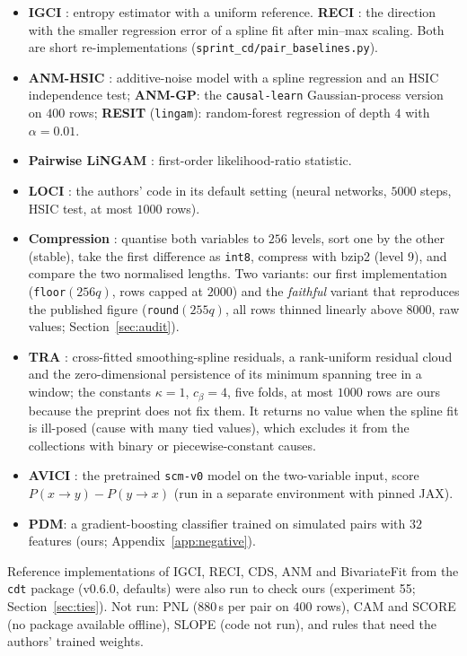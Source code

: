 \begin{itemize}
\item \textbf{IGCI} \citep{daniusis2010inferring}: entropy estimator with a uniform reference. \textbf{RECI} \citep{blobaum2018cause}: the direction with the smaller regression error of a spline fit after min--max scaling. Both are short re-implementations (\texttt{sprint\_cd/pair\_baselines.py}).
\item \textbf{ANM-HSIC} \citep{hoyer2009nonlinear}: additive-noise model with a spline regression and an HSIC independence test; \textbf{ANM-GP}: the \texttt{causal-learn} Gaussian-process version on $400$ rows; \textbf{RESIT} (\texttt{lingam}): random-forest regression of depth $4$ with $\alpha=0.01$.
\item \textbf{Pairwise LiNGAM} \citep{hyvarinen2013pairwise}: first-order likelihood-ratio statistic.
\item \textbf{LOCI} \citep{immer2023loci}: the authors' code in its default setting (neural networks, $5000$ steps, HSIC test, at most $1000$ rows).
\item \textbf{Compression} \citep{stienstra2026oneruler}: quantise both variables to $256$ levels, sort one by the other (stable), take the first difference as \texttt{int8}, compress with bzip2 (level 9), and compare the two normalised lengths. Two variants: our first implementation (\texttt{floor}$(256q)$, rows capped at $2000$) and the \emph{faithful} variant that reproduces the published figure (\texttt{round}$(255q)$, all rows thinned linearly above $8000$, raw values; Section~\ref{sec:audit}).
\item \textbf{TRA} \citep{elbouchattaoui2026tra}: cross-fitted smoothing-spline residuals, a rank-uniform residual cloud and the zero-dimensional persistence of its minimum spanning tree in a window; the constants $\kappa=1$, $c_\beta=4$, five folds, at most $1000$ rows are ours because the preprint does not fix them. It returns no value when the spline fit is ill-posed (cause with many tied values), which excludes it from the collections with binary or piecewise-constant causes.
\item \textbf{AVICI} \citep{lorch2022amortized}: the pretrained \texttt{scm-v0} model on the two-variable input, score $P(x\to y)-P(y\to x)$ (run in a separate environment with pinned JAX).
\item \textbf{PDM}: a gradient-boosting classifier trained on simulated pairs with $32$ features (ours; Appendix~\ref{app:negative}).
\end{itemize}
Reference implementations of IGCI, RECI, CDS, ANM and BivariateFit from the \texttt{cdt} package (v0.6.0, defaults) were also run to check ours (experiment 55; Section~\ref{sec:ties}). Not run: PNL (880\,s per pair on $400$ rows), CAM and SCORE (no package available offline), SLOPE (code not run), and rules that need the authors' trained weights.

